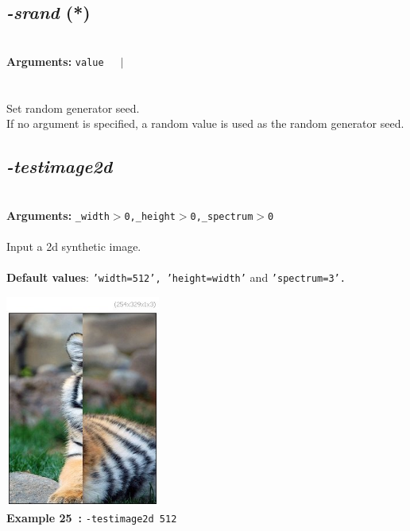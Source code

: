 \documentclass[a4paper,11pt,twoside]{book}
\begin{document}
\subsection{\emph{-srand} (*)}\vspace*{-0.5em}
~\\\textbf{Arguments: } 
{\small \texttt{value}}~~~$|$\\
\\~\\
Set random generator seed.
~\\If no argument is specified, a random value is used as the random generator seed.


\subsection{\emph{-testimage2d} }\vspace*{-0.5em}
~\\\textbf{Arguments: } 
{\small \texttt{\_width$>$0,\_height$>$0,\_spectrum$>$0}}\\~\\
Input a 2d synthetic image.
~\\~\\\textbf{Default values}: {\small \texttt{'width=512', 'height=width'} and \texttt{'spectrum=3'.}}
\begin{center}\includegraphics[keepaspectratio=true,height=7cm,width=\textwidth]{img/gmic_def25.jpg}\\
{\footnotesize \textbf{Example 25~:} \texttt{-testimage2d 512}}
\end{center}
\end{document}
